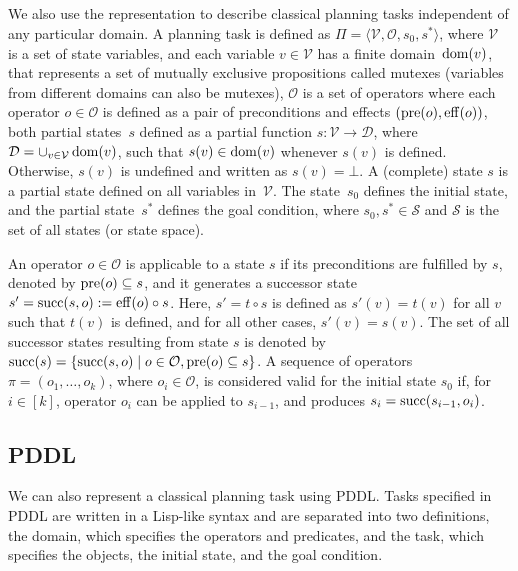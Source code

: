 \documentclass[ppgc,diss,english]{iiufrgs}
\begin{document}
\subsection{\sas}
\label{sec:background-sas}
We also use the \sas representation to describe classical planning tasks independent of any particular domain. A \sas planning task is defined as $\Pi=\langle\mathcal{V},\mathcal{O},s_0,s^*\rangle$, where $\mathcal{V}$ is a set of state variables, and each variable $v\in \mathcal{V}$ has a finite domain~$\operatorname{dom}(v)$, that represents a set of mutually exclusive propositions called mutexes (variables from different domains can also be mutexes), $\mathcal{O}$ is a set of operators where each operator $o \in \mathcal{O}$ is defined as a pair of preconditions and effects $(\operatorname{pre}(o),\operatorname{eff}(o))$, both partial states~$s$ defined as a partial function $s:\mathcal{V}\rightarrow \mathcal{D}$, where $\mathcal{D}=\cup_{v\in \mathcal{V}}\operatorname{dom}(v)$, such that $s(v)\in \operatorname{dom}(v)$ whenever $s(v)$ is defined. Otherwise, $s(v)$ is undefined and written as $s(v)=\bot$.  A (complete) state $s$ is a partial state defined on all variables in~$\mathcal{V}$. The state~$s_0$ defines the initial state, and the partial state~$s^*$ defines the goal condition, where $s_0, s^* \in \mathcal{S}$ and $\mathcal{S}$ is the set of all states (or state space).

An operator $o \in \mathcal{O}$ is applicable to a state $s$ if its preconditions are fulfilled by $s$, denoted by $\operatorname{pre}(o) \subseteq s$, and it generates a successor state $s'=\operatorname{succ}(s,o):=\operatorname{eff}(o)\circ s$. Here, $s'=t\circ s$ is defined as $s'(v)=t(v)$ for all $v$ such that $t(v)$ is defined, and for all other cases, $s'(v)=s(v)$. The set of all successor states resulting from state $s$ is denoted by $\operatorname{succ}(s)=\{{\operatorname{succ}(s,o)\mid o\in \mathcal{O}, \operatorname{pre}(o) \subseteq s}\}$. A sequence of operators $\pi=(o_1,\ldots,o_k)$, where $o_i\in \mathcal{O}$, is considered valid for the initial state $s_0$ if, for $i\in[k]$, operator $o_i$ can be applied to $s_{i-1}$, and produces $s_i=\operatorname{succ}(s_{i-1},o_i)$. %

\subsection{PDDL}
\label{sec:background-pddl}
We can also represent a classical planning task using PDDL. Tasks specified in PDDL are written in a Lisp-like syntax and are separated into two definitions, the domain, which specifies the operators and predicates, and the task, which specifies the objects, the initial state, and the goal condition.
\end{document}
